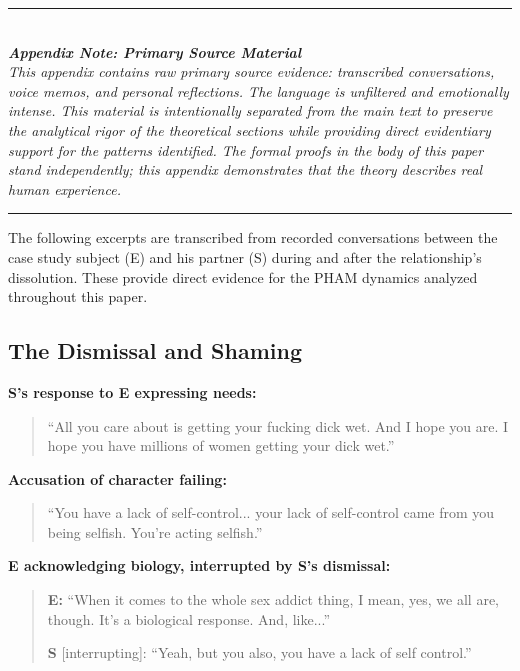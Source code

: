 \documentclass[12pt, letterpaper]{article}
\begin{document}
\begin{center}
\rule{0.6\textwidth}{0.4pt}\\[0.5em]
\textit{\textbf{Appendix Note: Primary Source Material}}\\[0.3em]
\textit{This appendix contains raw primary source evidence: transcribed conversations, voice memos, and personal reflections. The language is unfiltered and emotionally intense. This material is intentionally separated from the main text to preserve the analytical rigor of the theoretical sections while providing direct evidentiary support for the patterns identified. The formal proofs in the body of this paper stand independently; this appendix demonstrates that the theory describes real human experience.}\\[0.5em]
\rule{0.6\textwidth}{0.4pt}
\end{center}

\vspace{1em}

The following excerpts are transcribed from recorded conversations between the case study subject (E) and his partner (S) during and after the relationship's dissolution. These provide direct evidence for the PHAM dynamics analyzed throughout this paper.

\subsection{The Dismissal and Shaming}

\textbf{S's response to E expressing needs:}
\begin{quote}
``All you care about is getting your fucking dick wet. And I hope you are. I hope you have millions of women getting your dick wet.''
\end{quote}

\textbf{Accusation of character failing:}
\begin{quote}
``You have a lack of self-control... your lack of self-control came from you being selfish. You're acting selfish.''
\end{quote}

\textbf{E acknowledging biology, interrupted by S's dismissal:}
\begin{quote}
\textbf{E:} ``When it comes to the whole sex addict thing, I mean, yes, we all are, though. It's a biological response. And, like...''

\textbf{S} [interrupting]: ``Yeah, but you also, you have a lack of self control.''
\end{quote}
\end{document}
